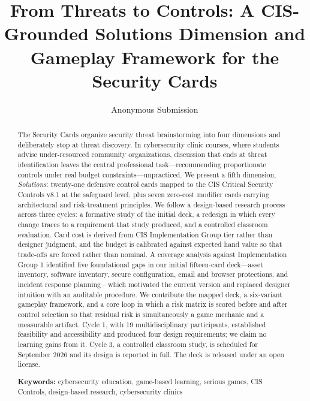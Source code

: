\documentclass[10pt,twocolumn,letterpaper]{article}
\title{\vspace{-1.6em}\bfseries From Threats to Controls: A CIS-Grounded
Solutions Dimension and Gameplay Framework for the Security Cards}
\author{\normalsize Anonymous Submission}
\date{}
\begin{document}
\maketitle

\begin{abstract}
\noindent\small
The Security Cards organize security threat brainstorming into four dimensions
and deliberately stop at threat discovery. In cybersecurity clinic courses,
where students advise under-resourced community organizations, discussion that
ends at threat identification leaves the central professional task---recommending
proportionate controls under real budget constraints---unpracticed. We present a
fifth dimension, \emph{Solutions}: twenty-one defensive control cards mapped to
the CIS Critical Security Controls v8.1 at the safeguard level, plus seven
zero-cost modifier cards carrying architectural and risk-treatment principles.
We follow a design-based research process across three cycles: a formative study
of the initial deck, a redesign in which every change traces to a requirement
that study produced, and a controlled classroom evaluation. Card cost is derived
from CIS Implementation Group tier rather than designer judgment, and the budget
is calibrated against expected hand value so that trade-offs are forced rather
than nominal. A coverage analysis against
Implementation Group 1 identified five foundational gaps in our initial
fifteen-card deck---asset inventory, software inventory, secure configuration,
email and browser protections, and incident response planning---which motivated
the current version and replaced designer intuition with an auditable procedure.
We contribute the mapped deck, a six-variant gameplay framework, and a core loop
in which a risk matrix is scored before and after control selection so that
residual risk is simultaneously a game mechanic and a measurable artifact.
Cycle 1, with 19 multidisciplinary participants, established feasibility and
accessibility and produced four design requirements; we claim no learning gains
from it. Cycle 3, a controlled classroom study, is scheduled for September 2026
and its design is reported in full. The deck is released under an open license.

\vspace{0.5em}
\noindent\textbf{Keywords:} cybersecurity education, game-based learning,
serious games, CIS Controls, design-based research, cybersecurity clinics
\end{abstract}

\vspace{0.6em}
\end{document}
